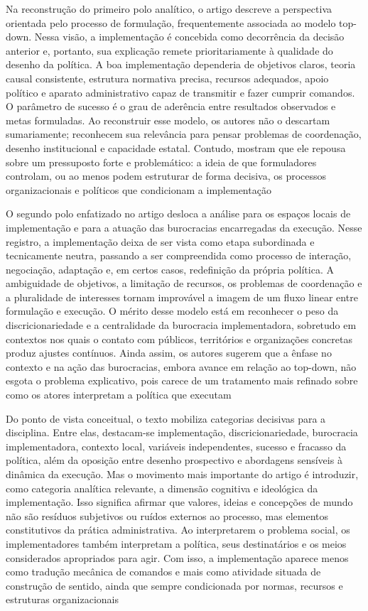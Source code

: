 \documentclass[12pt,a4paper]{article}
\begin{document}
Na reconstrução do primeiro polo analítico, o artigo descreve a perspectiva orientada pelo processo de formulação, frequentemente associada ao modelo top-down. Nessa visão, a implementação é concebida como decorrência da decisão anterior e, portanto, sua explicação remete prioritariamente à qualidade do desenho da política. A boa implementação dependeria de objetivos claros, teoria causal consistente, estrutura normativa precisa, recursos adequados, apoio político e aparato administrativo capaz de transmitir e fazer cumprir comandos. O parâmetro de sucesso é o grau de aderência entre resultados observados e metas formuladas. Ao reconstruir esse modelo, os autores não o descartam sumariamente; reconhecem sua relevância para pensar problemas de coordenação, desenho institucional e capacidade estatal. Contudo, mostram que ele repousa sobre um pressuposto forte e problemático: a ideia de que formuladores controlam, ou ao menos podem estruturar de forma decisiva, os processos organizacionais e políticos que condicionam a implementação\parencite{ascenzi2013_implementacao_politicas}

O segundo polo enfatizado no artigo desloca a análise para os espaços locais de implementação e para a atuação das burocracias encarregadas da execução. Nesse registro, a implementação deixa de ser vista como etapa subordinada e tecnicamente neutra, passando a ser compreendida como processo de interação, negociação, adaptação e, em certos casos, redefinição da própria política. A ambiguidade de objetivos, a limitação de recursos, os problemas de coordenação e a pluralidade de interesses tornam improvável a imagem de um fluxo linear entre formulação e execução. O mérito desse modelo está em reconhecer o peso da discricionariedade e a centralidade da burocracia implementadora, sobretudo em contextos nos quais o contato com públicos, territórios e organizações concretas produz ajustes contínuos. Ainda assim, os autores sugerem que a ênfase no contexto e na ação das burocracias, embora avance em relação ao top-down, não esgota o problema explicativo, pois carece de um tratamento mais refinado sobre como os atores interpretam a política que executam\parencite{ascenzi2013_implementacao_politicas}

Do ponto de vista conceitual, o texto mobiliza categorias decisivas para a disciplina. Entre elas, destacam-se implementação, discricionariedade, burocracia implementadora, contexto local, variáveis independentes, sucesso e fracasso da política, além da oposição entre desenho prospectivo e abordagens sensíveis à dinâmica da execução. Mas o movimento mais importante do artigo é introduzir, como categoria analítica relevante, a dimensão cognitiva e ideológica da implementação. Isso significa afirmar que valores, ideias e concepções de mundo não são resíduos subjetivos ou ruídos externos ao processo, mas elementos constitutivos da prática administrativa. Ao interpretarem o problema social, os implementadores também interpretam a política, seus destinatários e os meios considerados apropriados para agir. Com isso, a implementação aparece menos como tradução mecânica de comandos e mais como atividade situada de construção de sentido, ainda que sempre condicionada por normas, recursos e estruturas organizacionais\parencite{ascenzi2013_implementacao_politicas}
\end{document}

